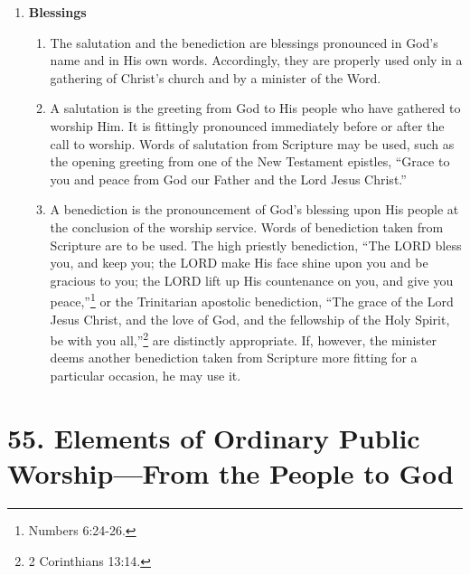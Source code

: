 \documentclass[
]{book}
\providecommand{\tightlist}{%
  \setlength{\itemsep}{0pt}\setlength{\parskip}{0pt}}
\begin{document}
\begin{enumerate}
\def\labelenumi{\arabic{enumi}.}
\setcounter{enumi}{4}
\tightlist
\item
  \textbf{Blessings}

  \begin{enumerate}
  \def\labelenumii{\alph{enumii}.}
  \tightlist
  \item
    The salutation and the benediction are blessings pronounced in God's name and in His own words. Accordingly, they are properly used only in a gathering of Christ's church and by a minister of the Word.
  \item
    A salutation is the greeting from God to His people who have gathered to worship Him. It is fittingly pronounced immediately before or after the call to worship. Words of salutation from Scripture may be used, such as the opening greeting from one of the New Testament epistles, ``Grace to you and peace from God our Father and the Lord Jesus Christ.''
  \item
    A benediction is the pronouncement of God's blessing upon His people at the conclusion of the worship service. Words of benediction taken from Scripture are to be used. The high priestly benediction, ``The LORD bless you, and keep you; the LORD make His face shine upon you and be gracious to you; the LORD lift up His countenance on you, and give you peace,''\footnote{Numbers 6:24-26.} or the Trinitarian apostolic benediction, ``The grace of the Lord Jesus Christ, and the love of God, and the fellowship of the Holy Spirit, be with you all,''\footnote{2 Corinthians 13:14.} are distinctly appropriate. If, however, the minister deems another benediction taken from Scripture more fitting for a particular occasion, he may use it.
  \end{enumerate}
\end{enumerate}

\hypertarget{elements-of-ordinary-public-worshipfrom-the-people-to-god}{%
\section*{55. Elements of Ordinary Public Worship---From the People to God}\label{elements-of-ordinary-public-worshipfrom-the-people-to-god}}

\protect\hypertarget{chapter-slug-54-elements-of-ordinary-public-worship-from-the-people-to-god}{\href{}{}}
\end{document}
